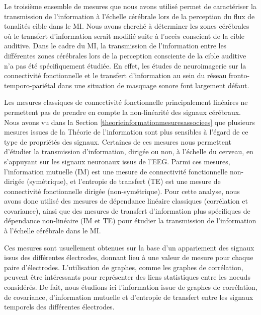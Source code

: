 Le troisième ensemble de mesures que nous avons utilisé permet de caractériser la transmission de l'information à l'échelle cérébrale lors de la perception du flux de tonalités cible dans le MI. 
Nous avons cherché à déterminer les zones cérébrales où le transfert d'information serait modifié suite à l'accès conscient de la cible auditive. 
Dans le cadre du MI, la transmission de l'information entre les différentes zones cérébrales lors de la perception consciente de la cible auditive n'a pas été spécifiquement étudiée. 
En effet, les études de neuroimagerie sur la connectivité fonctionnelle et le transfert d'information au sein du réseau fronto-temporo-pariétal dans une situation de masquage sonore font largement défaut. 

Les mesures classiques de connectivité fonctionnelle principalement linéaires ne permettent pas de prendre en compte la non-linéarité des signaux cérébraux. 
Nous avons vu dans la Section \ref{theorieinformationmesuresassociees} que plusieurs mesures issues de la Théorie de l'information sont plus sensibles à l'égard de ce type de propriétés des signaux. 
Certaines de ces mesures nous permettent d'étudier la transmission d'information, dirigée ou non, à l'échelle du cerveau, en s'appuyant sur les signaux neuronaux issus de l'EEG. 
Parmi ces mesures, l'information mutuelle (IM) est une mesure de connectivité fonctionnelle non-dirigée (symétrique), et l'entropie de transfert (TE) est une mesure de connectivité fonctionnelle dirigée (non-symétrique). 
Pour cette analyse, nous avons donc utilisé des mesures de dépendance linéaire classiques (corrélation et covariance), ainsi que des mesures de transfert d'information plus spécifiques de dépendance non-linéaire (IM et TE) pour étudier la transmission de l’information à l’échelle cérébrale dans le MI.

Ces mesures sont usuellement obtenues sur la base d'un appariement des signaux issus des différentes électrodes, donnant lieu à une valeur de mesure pour chaque paire d'électrodes. 
L'utilisation de graphes, comme les graphes de corrélation, peuvent être intéressants pour représenter des liens statistiques entre les noeuds considérés. 
De fait, nous étudions ici l'information issue de graphes de corrélation, de covariance, d'information mutuelle et d'entropie de transfert entre les signaux temporels des différentes électrodes.

